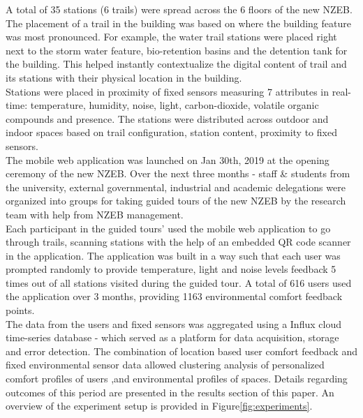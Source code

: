 
A total of 35 stations (6 trails) were spread across the 6 floors of the new NZEB. The placement of a trail in the building was based on where the building feature was most pronounced. For example, the water trail stations were placed right next to the storm water feature, bio-retention basins and the detention tank for the building. This helped instantly contextualize the digital content of trail and its stations with their physical location in the building.\\

Stations were placed in proximity of fixed sensors measuring 7 attributes in real-time: temperature, humidity, noise, light, carbon-dioxide, volatile organic compounds and presence. The stations were distributed across outdoor and indoor spaces based on trail configuration, station content, proximity to fixed sensors.\\

The mobile web application was launched on Jan 30th, 2019 at the opening ceremony of the new NZEB. Over the next three months - staff \& students from the university, external governmental, industrial and academic delegations were organized into groups for taking guided tours of the new NZEB by the research team with help from NZEB management.\\

Each participant in the guided tours' used the mobile web application to go through trails, scanning stations with the help of an embedded QR code scanner in the application. The application was built in a way such that each user was prompted randomly to provide temperature, light and noise levels feedback 5 times out of all stations visited during the guided tour. A total of 616 users used the application over 3 months, providing 1163 environmental comfort feedback points.\\

The data from the users and fixed sensors was aggregated using a Influx cloud time-series database - which served as a platform for data acquisition, storage and error detection. The combination of location based user comfort feedback and fixed environmental sensor data allowed clustering analysis of personalized comfort profiles of users ,and environmental profiles of spaces. Details regarding outcomes of this period are presented in the results section of this paper. An overview of the experiment setup is provided in Figure\ref{fig:experiments}.\\



